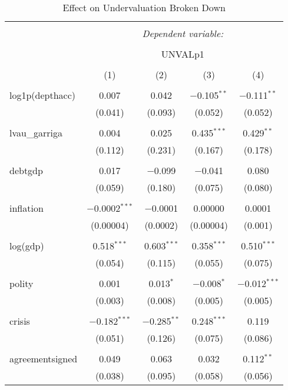 \documentclass[]{article}
\begin{document}
\begin{table}[!htbp] \centering 
  \caption{Effect on Undervaluation Broken Down} 
  \label{} 
\begin{tabular}{@{\extracolsep{5pt}}lcccc} 
\\[-1.8ex]\hline 
\hline \\[-1.8ex] 
 & \multicolumn{4}{c}{\textit{Dependent variable:}} \\ 
\cline{2-5} 
\\[-1.8ex] & \multicolumn{4}{c}{UNVALp1} \\ 
\\[-1.8ex] & (1) & (2) & (3) & (4)\\ 
\hline \\[-1.8ex] 
 log1p(depthacc) & 0.007 & 0.042 & $-$0.105$^{**}$ & $-$0.111$^{**}$ \\ 
  & (0.041) & (0.093) & (0.052) & (0.052) \\ 
  & & & & \\ 
 lvau\_garriga & 0.004 & 0.025 & 0.435$^{***}$ & 0.429$^{**}$ \\ 
  & (0.112) & (0.231) & (0.167) & (0.178) \\ 
  & & & & \\ 
 debtgdp & 0.017 & $-$0.099 & $-$0.041 & 0.080 \\ 
  & (0.059) & (0.180) & (0.075) & (0.080) \\ 
  & & & & \\ 
 inflation & $-$0.0002$^{***}$ & $-$0.0001 & 0.00000 & 0.0001 \\ 
  & (0.00004) & (0.0002) & (0.00004) & (0.001) \\ 
  & & & & \\ 
 log(gdp) & 0.518$^{***}$ & 0.603$^{***}$ & 0.358$^{***}$ & 0.510$^{***}$ \\ 
  & (0.054) & (0.115) & (0.055) & (0.075) \\ 
  & & & & \\ 
 polity & 0.001 & 0.013$^{*}$ & $-$0.008$^{*}$ & $-$0.012$^{***}$ \\ 
  & (0.003) & (0.008) & (0.005) & (0.005) \\ 
  & & & & \\ 
 crisis & $-$0.182$^{***}$ & $-$0.285$^{**}$ & 0.248$^{***}$ & 0.119 \\ 
  & (0.051) & (0.126) & (0.075) & (0.086) \\ 
  & & & & \\ 
 agreementsigned & 0.049 & 0.063 & 0.032 & 0.112$^{**}$ \\ 
  & (0.038) & (0.095) & (0.058) & (0.056) \\ 

\end{tabular}
\end{table}
\end{document}
